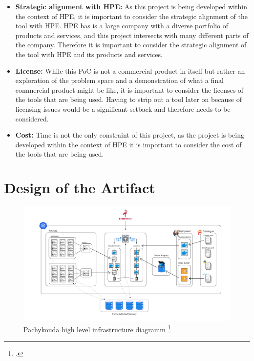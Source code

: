 \begin{itemize}
    \item \textbf{Strategic alignment with \ac{HPE}:}
        As this project is being developed within the context of \ac{HPE}, it is important to consider the strategic alignment of the tool with \ac{HPE}.
        \ac{HPE} has is a large company with a diverse portfolio of products and services, and this project intersects with many different parts of the company.
        Therefore it is important to consider the strategic alignment of the tool with \ac{HPE} and its products and services.

    \item \textbf{License:}
        While this \ac{PoC} is not a commercial product in itself but rather an exploration of the problem space and a demonstration of what a final commercial product  might be like,
        it is important to consider the licenses of the tools that are being used.
        Having to strip out a tool later on because of licensing issues would be a significant setback and therefore needs to be considered.

    \item \textbf{Cost:}
        Time is not the only constraint of this project, as the project is being developed within the context of \ac{HPE} it is important to consider the cost of the tools that are being used.
        

\end{itemize}

\newpage

\section{Design of the Artifact}





\begin{figure}[htb]
    \centering
    \includegraphics[width=16cm]{graphics/pachykouda.png}
    \caption[pachykouda high level diagramm]{Pachykouda high level infrastructure diagramm \footcite{eckerthHASPHPCApplications}}
    \label{abb:Logo2cmBreit}
\end{figure}


